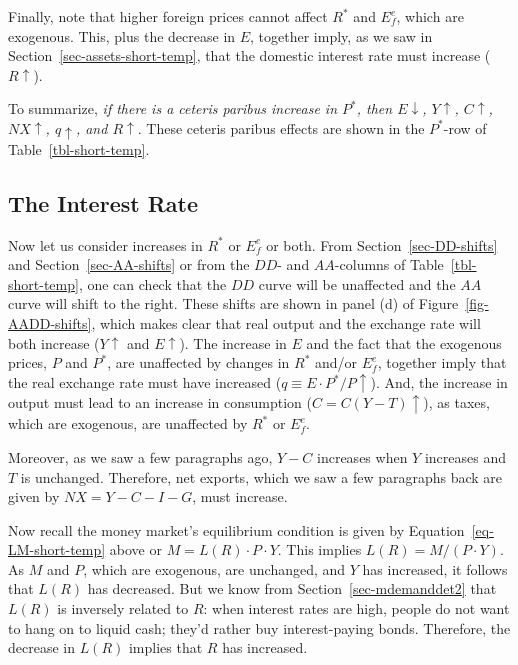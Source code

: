 \documentclass[
  letterpaper,
]{book}
\theoremstyle{plain}
\theoremstyle{remark}
\begin{document}
Finally, note that higher foreign prices cannot affect \(R^*\) and
\(E_f^e\), which are exogenous. This, plus the decrease in \(E\),
together imply, as we saw in Section~\ref{sec-assets-short-temp}, that
the domestic interest rate must increase (\(R\uparrow\)).

To summarize, \emph{if there is a ceteris paribus increase in \(P^*\),
then \(E\downarrow\), \(Y\uparrow\), \(C\uparrow\), \(NX\uparrow\),
\(q\uparrow\), and \(R\uparrow\)}. These ceteris paribus effects are
shown in the \(P^*\)-row of Table~\ref{tbl-short-temp}.

\subsection{The Interest Rate}\label{sec-rstar-efe-short-temp}

Now let us consider increases in \(R^*\) or \(E_f^e\) or both. From
Section~\ref{sec-DD-shifts} and Section~\ref{sec-AA-shifts} or from the
\(DD\)- and \(AA\)-columns of Table~\ref{tbl-short-temp}, one can check
that the \(DD\) curve will be unaffected and the \(AA\) curve will shift
to the right. These shifts are shown in panel (d) of
Figure~\ref{fig-AADD-shifts}, which makes clear that real output and the
exchange rate will both increase (\(Y\uparrow\) and \(E\uparrow\)). The
increase in \(E\) and the fact that the exogenous prices, \(P\) and
\(P^*\), are unaffected by changes in \(R^*\) and/or \(E_f^e\), together
imply that the real exchange rate must have increased
(\(q\equiv E\cdot P^*/P\uparrow\)). And, the increase in output must
lead to an increase in consumption (\(C=C(Y-T)\uparrow\)), as taxes,
which are exogenous, are unaffected by \(R^*\) or \(E_f^e\).

Moreover, as we saw a few paragraphs ago, \(Y-C\) increases when \(Y\)
increases and \(T\) is unchanged. Therefore, net exports, which we saw a
few paragraphs back are given by \(NX=Y-C-I-G\), must increase.

Now recall the money market's equilibrium condition is given by
Equation~\ref{eq-LM-short-temp} above or \(M=L(R)\cdot P\cdot Y\). This
implies \(L(R)=M/(P\cdot Y)\). As \(M\) and \(P\), which are exogenous,
are unchanged, and \(Y\) has increased, it follows that \(L(R)\) has
decreased. But we know from Section~\ref{sec-mdemanddet2} that \(L(R)\)
is inversely related to \(R\): when interest rates are high, people do
not want to hang on to liquid cash; they'd rather buy interest-paying
bonds. Therefore, the decrease in \(L(R)\) implies that \(R\) has
increased.
\end{document}
